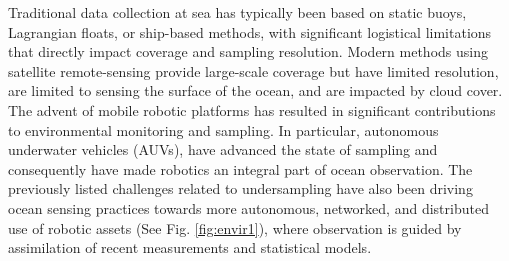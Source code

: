 \documentclass[aoas]{imsart}
\begin{document}
Traditional data collection at sea has typically been based on static
buoys, Lagrangian floats, or ship-based methods, with significant
logistical limitations that directly impact coverage and sampling
resolution. Modern methods using satellite remote-sensing provide
large-scale coverage but have limited resolution, are limited to
sensing the surface of the ocean, and are impacted by cloud cover. The
advent of mobile robotic platforms \citep{Bellingham07} has
resulted in significant contributions to environmental monitoring and
sampling. In particular, autonomous underwater vehicles (AUVs), have
advanced the state of sampling and consequently have made robotics an
integral part of ocean observation. The previously listed challenges related to undersampling have also been driving ocean sensing practices towards more autonomous, networked, and distributed use of robotic assets (See Fig. \ref{fig:envir1}), where observation is guided by assimilation of recent measurements and statistical models.

\end{document}
